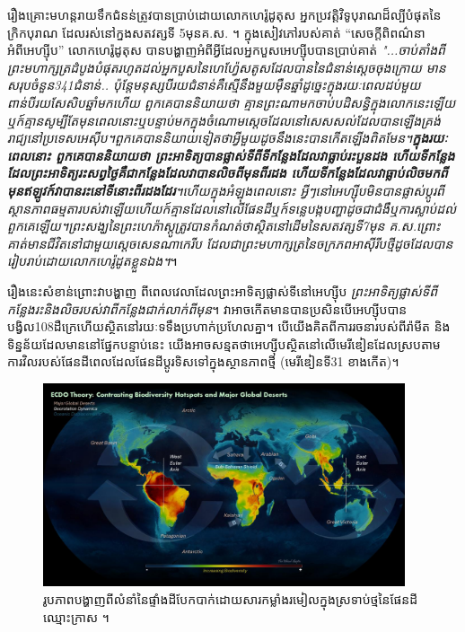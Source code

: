 \documentclass[10pt,twocolumn,letterpaper]{article}
\begin{document}
រឿងគ្រោះមហន្តរាយទឹកជំនន់ត្រូវបានប្រាប់ដោយលោកហេរ៉ូដូតុស អ្នកប្រវត្តិវិទូបុរាណដ៏ល្បីបំផុតនៃក្រិកបុរាណ ដែលរស់នៅក្នងសតវត្សទី 5​មុនគ.ស. \cite{31}។ ក្នុងសៀវភៅរបស់គាត់ “សេចក្តីពិពណ៌នាអំពីអេហ្ស៊ីប” លោកហេរ៉ូដូតុស បានបង្ហាញអំពីអ្វីដែលអ្នកបួសអេហ្ស៊ីបបានប្រាប់គាត់ \textit{"...ចាប់តាំងពីព្រះមហាក្សត្រដំបូងបំផុតរហូតដល់អ្នកបួសនៃហេហ្វ៉ែសតូសដែលបាននៃជំនាន់ស្តេចចុងក្រោយ មានសរុបចំនួន341ជំនាន់.. ប៉ុន្តែមនុស្សបីរយជំនាន់គឺស្មើនឹងមួយម៉ឺនឆ្នាំ​ដូច្នេះក្នុងរយៈពេលដប់មួយពាន់បីរយសែសិបឆ្នាំមកហើយ ពួកគេបាននិយាយថា គ្មានព្រះណាមកចាប់បដិសន្ធិក្នុងលោកនេះឡើយ​ឬក៍គ្មានសូម្បីតែមុនពេលនោះឬបន្ទាប់មកក្នុងចំណោមស្ដេចដែលនៅសេសសល់ដែលបានឡើងគ្រង់រាជ្យនៅប្រទេសអេស៊ីប។ពួកគេបាននិយាយទៀតថាអ្វីមួយដូចនឹងនេះបានកើតឡើងពិតមែន។\textbf{ក្នុងរយៈពេលនោះ ពួកគេបាននិយាយថា ព្រះអាទិត្យបានផ្លាស់ទីពីទីកន្លែងដែលវាធ្លាប់រះបួនដង ហើយទីកន្លែងដែលព្រះអាទិត្យរះសព្វថ្ងៃគឺជាកន្លែងដែលវាបានលិចពីមុនពីរដង ហើយទីកន្លែងដែលវាធ្លាប់លិចមកពីមុនឥឡូវក៍វាបានរះនៅទីនោះពីរដងដែរ}។​ហើយក្នុងអំឡុងពេលនោះ អ្វីៗនៅអេហ្ស៊ីបមិនបានផ្លាស់ប្ដូរពីស្ថានភាពធម្មតារបស់វាឡើយ​ហើយក៍គ្មានដែលនៅលើផែនដីឬក៍ទន្លេបង្កបញ្ហាដូចជាជំងឺឬការស្លាប់ដល់ពួកគេឡើយ។\cite{32}ព្រះសង្ឃនៃព្រះហេភ៉ាស្តូត្រូវបានកំណត់ថាស្ថិតនៅដើមនៃសតវត្សទី7មុន គ.ស.ព្រោះគាត់មានជីវិតនៅជាមួយស្តេចសេនណាកេរីប ដែលជាព្រះមហាក្សត្រនៃចក្រភពអាស៊ីរីបថ្មីដូចដែលបានរៀបរាប់ដោយលោកហេរ៉ូដូតខ្លួនឯង។}\cite{32,33,34}។

រឿងនេះសំខាន់ព្រោះវាបង្ហាញ ពីពេលវេលាដែលព្រះអាទិត្យផ្លាស់ទីនៅអេហ្ស៊ីប \textit{ព្រះអាទិត្យផ្លាស់ទីពីកន្លែងរះនិងលិចរបស់វាពីកន្លែងជាក់លាក់ពីមុន}។ វាអាចកើតមានបានប្រសិនបើអេហ្ស៊ីបបានបង្វិល108ដឺក្រេហើយស្ថិតនៅរយៈទទឹងប្រហាក់ប្រហែលគ្នា។ បើយើងគិតពីការរចនារបស់ពីរ៉ាមីត និងទិន្នន័យដែលមាននៅផ្នែកបន្ទាប់នេះ យើងអាចសន្មតថាអេហ្ស៊ីបស្ថិតនៅលើមេរីឌៀនដែលស្របតាមការវិលរបស់ផែនដីពេលដែលផែនដីប្តូរទិសទៅក្នុងស្ថានភាពថ្មី (មេរីឌៀនទី​31 ខាងកើត)។

\begin{figure}[t]
\begin{center}
\includegraphics[width=0.95\textwidth]{biodiversity.jpg}
\end{center}
   \caption{រូបភាពបង្ហាញពីលំនាំនៃផ្ទាំងដីបែកបាក់ដោយសារកម្លាំងរមៀលក្នុងស្រទាប់ថ្មនៃផែនដីឈ្មោះក្រាស \cite{28}។}
\label{fig:9}
\end{figure}
\end{document}
